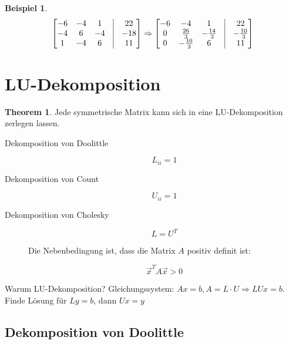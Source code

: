 \documentclass[11pt]{article} %
\theoremstyle{definition}
\newtheorem*{beispiel}{Beispiel}
\newtheorem{theorem}{Theorem}
\begin{document}
\begin{beispiel}
\[
\begin{bmatrix}
-6 & -4 & 1 &\vline& 22 \\ 
-4 & 6 & -4 &\vline& -18 \\ 
1 & -4 & 6 &\vline& 11
\end{bmatrix}
\Rightarrow
\begin{bmatrix}
-6 & -4 & 1 &\vline& 22 \\ 
0 & \frac{26} 3 & -\frac{14} 3 &\vline& -\frac{10} 3 \\ 
0 & -\frac{10} 3 & 6 &\vline& 11
\end{bmatrix}
\]
\end{beispiel}

\section{LU-Dekomposition}

\begin{theorem}
Jede symmetrische Matrix kann sich in eine LU-Dekomposition zerlegen lassen.
\end{theorem}

\begin{description}

\item[Dekomposition von Doolittle]

\[
L_{ii} = 1
\]

\item[Dekomposition von Count]

\[
U_{ii} = 1
\]

\item[Dekomposition von Cholesky]

\[
L = U^T
\]

Die Nebenbedingung ist, dass die Matrix $A$ positiv definit ist:

\[
\vec x^T A \vec x > 0
\]

\end{description}

Warum LU-Dekomposition? Gleichungssystem: $Ax = b, A = L\cdot U \Rightarrow LUx = b$. Finde Lösung für $Ly = b$, dann $Ux = y$

\subsection{Dekomposition von Doolittle}
\end{document}

